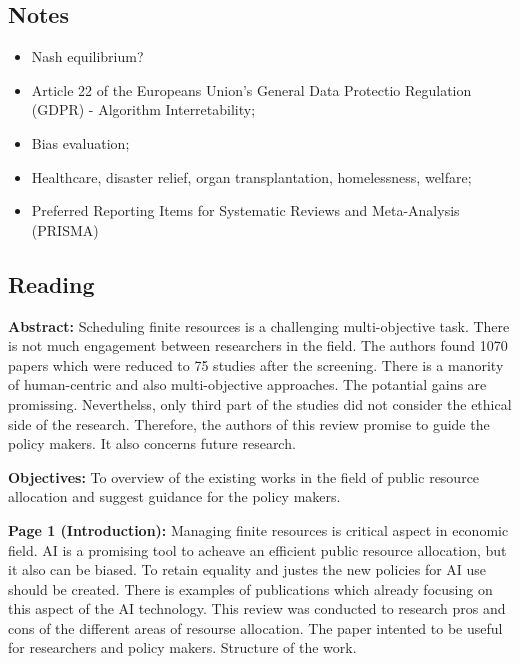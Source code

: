 \subsection{Notes}
    \begin{itemize}
        \item Nash equilibrium?
        \item Article 22 of the Europeans Union's General Data Protectio Regulation (GDPR) - Algorithm Interretability;
        \item Bias evaluation;
        \item Healthcare, disaster relief, organ transplantation, homelessness, welfare;
        \item Preferred Reporting Items for Systematic Reviews and Meta-Analysis (PRISMA)
    \end{itemize}


\subsection{Reading}
    \textbf{Abstract:}
    Scheduling finite resources is a challenging multi-objective task. There is not much engagement between researchers in the field. The authors found 1070 papers which were reduced to 75 studies after the screening. There is a manority of human-centric and also multi-objective approaches. The potantial gains are promissing. Neverthelss, only third part of the studies did not consider the ethical side of the research. Therefore, the authors of this review promise to guide the policy makers. It also concerns future research. 
    
    \textbf{Objectives:}
    To overview of the existing works in the field of public resource allocation and suggest guidance for the policy makers.

    
    \textbf{Page 1 (Introduction):}
    Managing finite resources is critical aspect in economic field. AI is a promising tool to acheave an efficient public resource allocation, but it also can be biased. To retain equality and justes the new policies for AI use should be created. There is examples of publications which already focusing on this aspect of the AI technology. This review was conducted to research pros and cons of the different areas of resourse allocation. The paper intented to be useful for researchers and policy makers. Structure of the work. 
    

